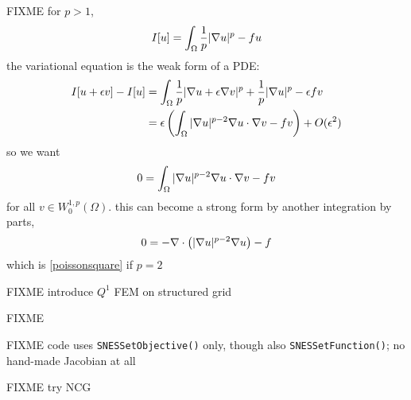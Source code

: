 FIXME for $p>1$,
    $$I[u] = \int_\Omega \frac{1}{p} |\nabla u|^p - fu$$
the variational equation is the weak form of a PDE:
\begin{align*}
I[u+\epsilon v] - I[u] &= \int_\Omega \frac{1}{p} |\nabla u + \epsilon \nabla v|^p + \frac{1}{p} |\nabla u|^p - \epsilon f v \\
   &= \epsilon \left(\int_\Omega |\nabla u|^{p-2} \nabla u \cdot \nabla v - f v\right) + O(\epsilon^2)
\end{align*}
so we want
    $$0 = \int_\Omega |\nabla u|^{p-2} \nabla u \cdot \nabla v - f v$$
for all $v \in W^{1,p}_0(\Omega)$.  this can become a strong form by another integration by parts,
    $$0 = - \nabla\cdot\left(|\nabla u|^{p-2} \nabla u\right) - f$$
which is \eqref{poissonsquare} if $p=2$

FIXME introduce $Q^1$ FEM on structured grid

\begin{marginfigure}

\caption{FIXME}
\label{fig:q1hat}
\end{marginfigure}

FIXME code uses \texttt{SNESSetObjective()} only, though also \texttt{SNESSetFunction()}; no hand-made Jacobian at all

FIXME try NCG
